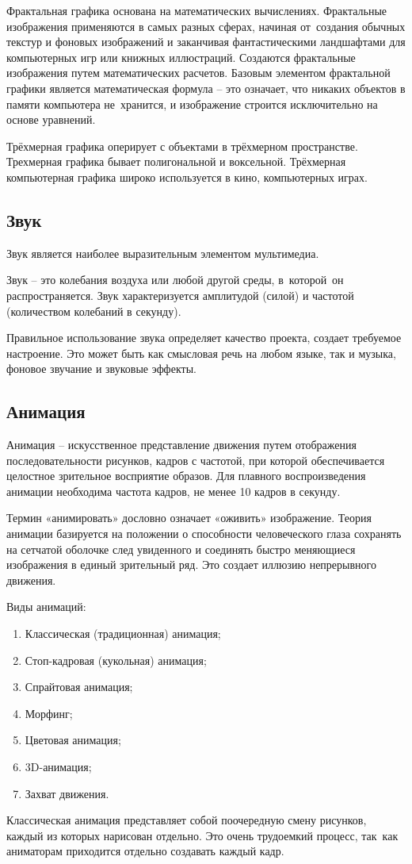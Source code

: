 \documentclass{ou}
\begin{document}
Фрактальная графика основана на математических вычислениях. Фрактальные изображения применяются в самых разных сферах, начиная от~создания обычных текстур и фоновых изображений и заканчивая фантастическими ландшафтами для компьютерных игр или книжных иллюстраций. Создаются фрактальные изображения путем математических расчетов. Базовым элементом фрактальной графики является математическая формула -- это означает, что никаких объектов в памяти компьютера не~хранится, и изображение строится исключительно на основе уравнений. 

Трёхмерная графика оперирует с объектами в трёхмерном пространстве. Трехмерная графика бывает полигональной и воксельной. Трёхмерная компьютерная графика широко используется в кино, компьютерных играх\cite{Panasenko_2022}.
\subsection{Звук}
Звук является наиболее выразительным элементом мультимедиа.

Звук -- это колебания воздуха или любой другой среды, в~которой~он распространяется. Звук характеризуется амплитудой (силой) и частотой (количеством колебаний в секунду).

Правильное использование звука определяет качество проекта, создает требуемое настроение. Это может быть как смысловая речь на любом языке, так и музыка, фоновое звучание и звуковые эффекты\cite{Katsko_2015}.
\subsection{Анимация}
Анимация -- искусственное представление движения путем отображения последовательности рисунков, кадров с частотой, при которой обеспечивается целостное зрительное восприятие образов. Для плавного воспроизведения анимации необходима частота кадров, не менее 10 кадров в секунду.

Термин «анимировать» дословно означает «оживить» изображение. Теория анимации базируется на положении о способности человеческого глаза сохранять на сетчатой оболочке след увиденного и соединять быстро меняющиеся изображения в единый зрительный ряд. Это создает иллюзию непрерывного движения.

Виды анимаций:
\begin{enumerate}[leftmargin=0em, itemindent=3.75em, nosep, label=\arabic*)]
\item Классическая (традиционная) анимация;
\item Стоп-кадровая (кукольная) анимация;
\item Спрайтовая анимация;
\item Морфинг;
\item Цветовая анимация;
\item 3D-анимация;
\item Захват движения\cite{Panasenko_2022}.
\end{enumerate}
Классическая  анимация представляет собой поочередную смену рисунков, каждый из которых нарисован отдельно. Это очень трудоемкий процесс, так~как аниматорам приходится отдельно создавать каждый кадр.
\end{document}
